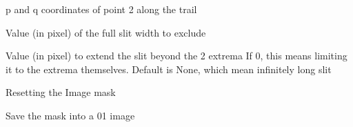 \documentclass[letterpaper,10pt,english]{sphinxmanual}
\begin{document}
\begin{fulllineitems}
\begin{fulllineitems}
\begin{description}
\sphinxAtStartPar
p and q coordinates of point 2 along the trail

\sphinxAtStartPar
Value (in pixel) of the full slit width to exclude

\sphinxAtStartPar
Value (in pixel) to extend the slit beyond the 2 extrema
If 0, this means limiting it to the extrema themselves.
Default is None, which mean infinitely long slit

\end{description}

\end{fulllineitems}


\begin{fulllineitems}
\label{\detokenize{api/pymusepipe:pymusepipe.mpdaf_pipe.MuseImage.reset_mask}}
\pysigstartsignatures
{}
\pysigstopsignatures
\sphinxAtStartPar
Resetting the Image mask

\end{fulllineitems}


\begin{fulllineitems}
\label{\detokenize{api/pymusepipe:pymusepipe.mpdaf_pipe.MuseImage.save_mask}}
\pysigstartsignatures
{}
\pysigstopsignatures
\sphinxAtStartPar
Save the mask into a 0\sphinxhyphen{}1 image

\end{fulllineitems}


\end{fulllineitems}

\end{document}
